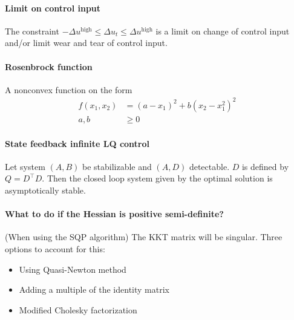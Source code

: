 \paragraph{Limit on control input} The constraint $-\Delta u^{\mathrm{high}} \leq \Delta u_t \leq \Delta u^{\mathrm{high}}$ is a limit on change of control input and/or limit wear and tear of control input.

\paragraph{Rosenbrock function} A nonconvex function on the form
\begin{equation}
\begin{split}
    f(x_1, x_2) &= (a - x_1)^2 +b(x_2-x_1^2)^2\\
    a, b &\geq 0
\end{split}
\end{equation}

\paragraph{State feedback infinite LQ control} Let system $(A,B)$ be stabilizable and $(A,D)$ detectable. $D$ is defined by $Q=D^\top D$. Then the closed loop system given by the optimal solution is asymptotically stable.

\paragraph{What to do if the Hessian is positive semi-definite?} (When using the SQP algorithm) The KKT matrix will be singular. Three options to account for this:
\begin{itemize}[nolistsep,noitemsep]
    \item Using Quasi-Newton method
    \item Adding a multiple of the identity matrix
    \item Modified Cholesky factorization
\end{itemize}
